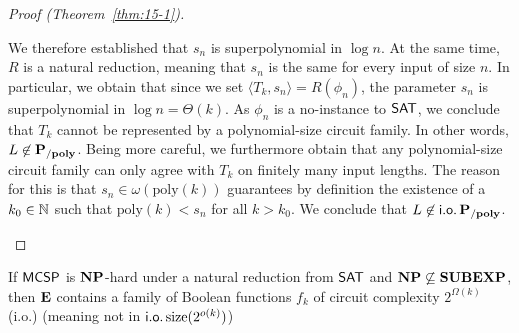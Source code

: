 \documentclass[11pt]{article}
\begin{document}
\begin{proof}[Proof (Theorem~\ref{thm:15-1})]
\begin{itemize}
\begin{enumerate}[(i)]
          We therefore established that $s_n$ is superpolynomial in $\log n$.
          At the same time, $R$ is a natural reduction, meaning that $s_n$ is
          the same for every input of size $n$.
          In particular, we obtain that since we set
          $\langle T_k, s_n \rangle = R(\phi_n)$, the parameter
          $s_n$ is superpolynomial in $\log n = \Theta(k)$.
          As $\phi_n$ is a no-instance to $\mathsf{SAT}$, we conclude that
          $T_k$ cannot be represented by a polynomial-size circuit family.
          In other words, $L \not\in \mathbf{P_{/poly}}$.
          Being more careful, we furthermore obtain that any polynomial-size
          circuit family can only agree with $T_k$ on finitely many
          input lengths. The reason for this is that
          $s_n \in \omega(\mathrm{poly}(k))$ guarantees
          by definition the existence of a $k_0 \in {\mathbb{N}}$ such that
          $\mathrm{poly}(k) < s_n$ for all $k > k_0$.
          We conclude that $L \not\in \mathsf{i.o.}\, \mathbf{P_{/poly}}$.
      \end{enumerate}
	\end{itemize}
\end{proof}

\begin{theorem}[\cite{10.1145/335305.335314}]
  \label{thm:15-2}
  If $\mathsf{MCSP}$ is $\mathbf{NP}$-hard under a natural reduction from
  $\mathsf{SAT}$ and $\mathbf{NP} \not\subseteq \mathbf{SUBEXP}$, then
  $\mathbf{E}$ contains a family of Boolean functions
  $f_k$ of circuit complexity $2^{\Omega(k)}$ (i.o.)
  {\color{gray}(meaning not in $\mathsf{i.o.}\, \mathrm{size}(2^{o(k)})$)}
\end{theorem}
\end{document}
